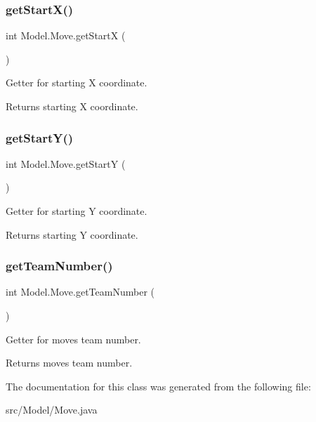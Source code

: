 \subsubsection{\texorpdfstring{get\+Start\+X()}{getStartX()}}
{\footnotesize\ttfamily int Model.\+Move.\+get\+StartX (\begin{DoxyParamCaption}{ }\end{DoxyParamCaption})}

Getter for starting X coordinate. \begin{DoxyReturn}{Returns}
starting X coordinate. 
\end{DoxyReturn}
\hypertarget{class_model_1_1_move_a4bbb121acdea24249ee7ea4466fd8e7a}{}\label{class_model_1_1_move_a4bbb121acdea24249ee7ea4466fd8e7a} 
\subsubsection{\texorpdfstring{get\+Start\+Y()}{getStartY()}}
{\footnotesize\ttfamily int Model.\+Move.\+get\+StartY (\begin{DoxyParamCaption}{ }\end{DoxyParamCaption})}

Getter for starting Y coordinate. \begin{DoxyReturn}{Returns}
starting Y coordinate. 
\end{DoxyReturn}
\hypertarget{class_model_1_1_move_adca5d2e7181293d311eca9062b4f9d1e}{}\label{class_model_1_1_move_adca5d2e7181293d311eca9062b4f9d1e} 
\subsubsection{\texorpdfstring{get\+Team\+Number()}{getTeamNumber()}}
{\footnotesize\ttfamily int Model.\+Move.\+get\+Team\+Number (\begin{DoxyParamCaption}{ }\end{DoxyParamCaption})}

Getter for move\textquotesingle{}s team number. \begin{DoxyReturn}{Returns}
move\textquotesingle{}s team number. 
\end{DoxyReturn}


The documentation for this class was generated from the following file\+:\begin{DoxyCompactItemize}
\item 
src/\+Model/Move.\+java\end{DoxyCompactItemize}
